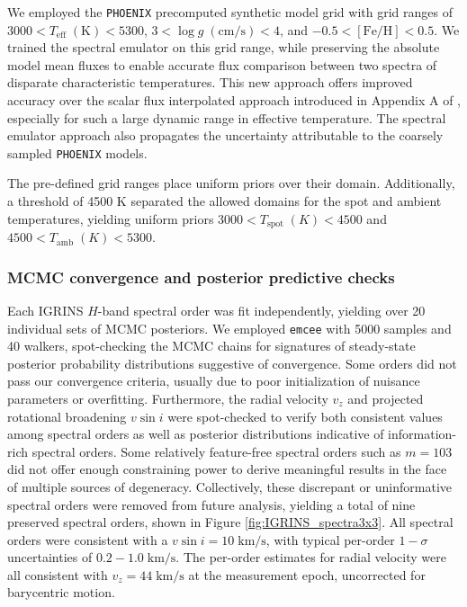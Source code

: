 \documentclass[modern,trackchanges]{aastex631}
\begin{document}
We employed the \texttt{PHOENIX} precomputed synthetic model grid \citep{husser13} with grid ranges of $3000 < T_{\mathrm{eff}} \; (\textrm{K}) < 5300 $, $3 < \log{g \;(\textrm{cm/s})}  < 4 $, and $ -0.5 <  [\mathrm{Fe}/\mathrm{H}] <0.5$.  We trained the spectral emulator \citep{czekala15} on this grid range, while preserving the absolute model mean fluxes to enable accurate flux comparison between two spectra of disparate characteristic temperatures.  This new approach offers improved accuracy over the scalar flux interpolated approach introduced in Appendix A of \citet{gullysantiago17}, especially for such a large dynamic range in effective temperature.  The spectral emulator approach also propagates the uncertainty attributable to the coarsely sampled \texttt{PHOENIX} models.

The pre-defined grid ranges place uniform priors over their domain.  Additionally, a threshold of 4500 K separated the allowed domains for the spot and ambient temperatures, yielding uniform priors $3000 < T_{\mathrm{spot}} \; (K) < 4500 $ and $4500 < T_{\mathrm{amb}} \; (K) < 5300$.

\subsubsection{MCMC convergence and posterior predictive checks}

Each IGRINS $H$-band spectral order was fit independently, yielding over 20 individual sets of MCMC posteriors.  We employed \texttt{emcee} \citep{foreman13} with 5000 samples and 40 walkers, spot-checking the MCMC chains for signatures of steady-state posterior probability distributions suggestive of convergence.  Some orders did not pass our convergence criteria, usually due to poor initialization of nuisance parameters or overfitting.  Furthermore, the radial velocity $v_z$ and projected rotational broadening $v\sin{i}$ were spot-checked to verify both consistent values among spectral orders as well as posterior distributions indicative of information-rich spectral orders.  Some relatively feature-free spectral orders such as $m=103$ did not offer enough constraining power to derive meaningful results in the face of multiple sources of degeneracy.  Collectively, these discrepant or uninformative spectral orders were removed from future analysis, yielding a total of nine preserved spectral orders, shown in Figure \ref{fig:IGRINS_spectra3x3}. All spectral orders were consistent with a $v\sin{i}=10 \;\mathrm{km/s}$, with typical per-order $1-\sigma$ uncertainties of $0.2-1.0 \;\mathrm{km/s}$.  The per-order estimates for radial velocity were all consistent with $v_z=44\;\mathrm{km/s}$ at the measurement epoch, uncorrected for barycentric motion.
\end{document}
